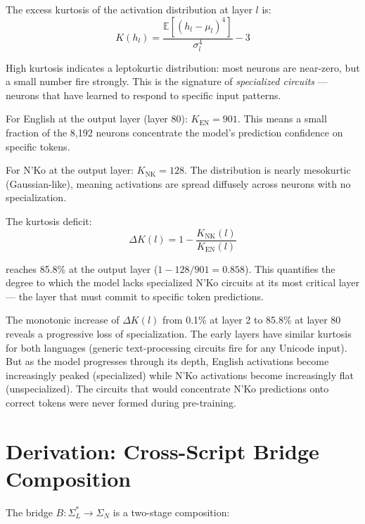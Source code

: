 \documentclass[11pt]{article}
\theoremstyle{remark}
\begin{document}
The excess kurtosis of the activation distribution at layer $l$ is:
\begin{equation}
K(h_l) = \frac{\mathbb{E}\left[(h_l - \mu_l)^4\right]}{\sigma_l^4} - 3
\end{equation}

High kurtosis indicates a leptokurtic distribution: most neurons are near-zero, but a small number fire strongly. This is the signature of \emph{specialized circuits} --- neurons that have learned to respond to specific input patterns.

For English at the output layer (layer 80): $K_{\text{EN}} = 901$. This means a small fraction of the 8,192 neurons concentrate the model's prediction confidence on specific tokens.

For N'Ko at the output layer: $K_{\text{NK}} = 128$. The distribution is nearly mesokurtic (Gaussian-like), meaning activations are spread diffusely across neurons with no specialization.

The kurtosis deficit:
\begin{equation}
\Delta K(l) = 1 - \frac{K_{\text{NK}}(l)}{K_{\text{EN}}(l)}
\end{equation}

reaches 85.8\% at the output layer ($1 - 128/901 = 0.858$). This quantifies the degree to which the model lacks specialized N'Ko circuits at its most critical layer --- the layer that must commit to specific token predictions.

The monotonic increase of $\Delta K(l)$ from 0.1\% at layer 2 to 85.8\% at layer 80 reveals a progressive loss of specialization. The early layers have similar kurtosis for both languages (generic text-processing circuits fire for any Unicode input). But as the model progresses through its depth, English activations become increasingly peaked (specialized) while N'Ko activations become increasingly flat (unspecialized). The circuits that would concentrate N'Ko predictions onto correct tokens were never formed during pre-training.

\section{Derivation: Cross-Script Bridge Composition}

The bridge $B: \Sigma_L^* \to \Sigma_N$ is a two-stage composition:
\end{document}
